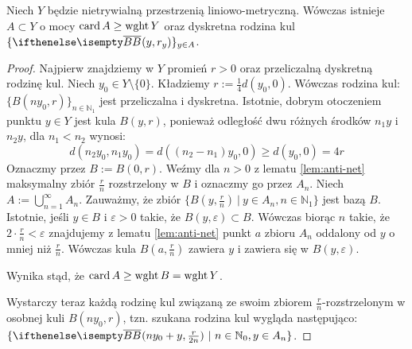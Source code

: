 \begin{lem} \label{lem:balls-many}
  Niech $Y$ będzie nietrywialną przestrzenią liniowo-metryczną. Wówczas istnieje $A \subset Y$ o mocy $\operatorname{card} A \geq \operatorname{wght} Y$ oraz dyskretna rodzina kul $\{\cl B(y, r_y)\}_{y \in A}$.
  
  \begin{proof}
    Najpierw znajdziemy w $Y$ promień $r > 0$ oraz przeliczalną dyskretną rodzinę kul. Niech $y_0 \in Y\setminus\{0\}$. Kładziemy $r := \frac{1}{4} d(y_0,0)$. Wówczas rodzina kul: $\{B(ny_0, r)\}_{n \in \mathbb{N}_1}$ jest przeliczalna i dyskretna. Istotnie, dobrym otoczeniem punktu $y \in Y$ jest kula $B(y,r)$, ponieważ odległość dwu różnych środków $n_1 y$ i $n_2 y$, dla $n_1 < n_2$ wynosi:
    \[
      d(n_2 y_0, n_1 y_0) = d((n_2 - n_1)y_0, 0) \geq d(y_0, 0) = 4r
    \]
    Oznaczmy przez $B := B(0,r)$. Weźmy dla $n > 0$ z lematu \ref{lem:anti-net} maksymalny zbiór $\frac{r}{n}$ rozstrzelony w $B$ i oznaczmy go przez $A_n$. Niech $A := \bigcup_{n=1}^\infty A_n$. Zauważmy, że zbiór $\{B(y, \frac{r}{n})\ |\ y \in A_n, n \in \mathbb{N}_1\}$ jest bazą $B$. Istotnie, jeśli $y \in B$ i $\varepsilon > 0$ takie, że $B(y,\varepsilon) \subset B$. Wówczas biorąc $n$ takie, że $2 \cdot \frac{r}{n} < \varepsilon$ znajdujemy z lematu \ref{lem:anti-net} punkt $a$ zbioru $A_n$ oddalony od $y$ o mniej niż $\frac{r}{n}$. Wówczas kula $B(a, \frac{r}{n})$ zawiera $y$ i zawiera się w $B(y,\varepsilon)$.
    
    Wynika stąd, że $\operatorname{card} A \geq \operatorname{wght} B = \operatorname{wght} Y$.
    
    Wystarczy teraz każdą rodzinę kul związaną ze swoim zbiorem $\frac{r}{n}$-rozstrzelonym w osobnej kuli $B(ny_0, r)$, tzn. szukana rodzina kul wygląda następująco: $\{\cl B(ny_0 + y, \frac{r}{2n})\ |\ n \in \mathbb{N}_0, y \in A_n\}$.
  \end{proof}
\end{lem}

